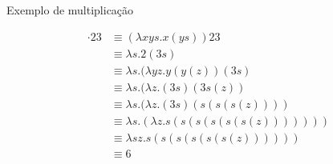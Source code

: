 \begin{frame}[fragile]{Exemplo de multiplicação}

    \begin{align*}
        \cdot 23 &\equiv (\lambda xys.x(ys))23 \\
        &\equiv \lambda s.2(3s) \\
        &\equiv \lambda s.(\lambda yz.y(y(z))(3s) \\
        &\equiv \lambda s.(\lambda z.(3s)(3s(z)) \\
        &\equiv \lambda s.(\lambda z.(3s)(s(s(s(z)))) \\
        &\equiv \lambda s.(\lambda z.s(s(s(s(s(s(z))))))) \\
        &\equiv \lambda sz.s(s(s(s(s(s(z)))))) \\
        &\equiv 6
    \end{align*}

\end{frame}
